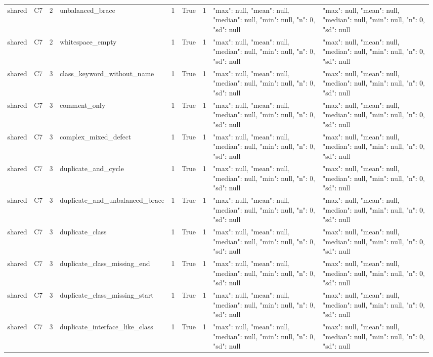 \begin{tabular}{lllllllll}
shared & C7 & 2 & unbalanced\_brace & 1 & True & 1 & {"max": null, "mean": null, "median": null, "min": null, "n": 0, "sd": null} & {"max": null, "mean": null, "median": null, "min": null, "n": 0, "sd": null} \\
shared & C7 & 2 & whitespace\_empty & 1 & True & 1 & {"max": null, "mean": null, "median": null, "min": null, "n": 0, "sd": null} & {"max": null, "mean": null, "median": null, "min": null, "n": 0, "sd": null} \\
shared & C7 & 3 & class\_keyword\_without\_name & 1 & True & 1 & {"max": null, "mean": null, "median": null, "min": null, "n": 0, "sd": null} & {"max": null, "mean": null, "median": null, "min": null, "n": 0, "sd": null} \\
shared & C7 & 3 & comment\_only & 1 & True & 1 & {"max": null, "mean": null, "median": null, "min": null, "n": 0, "sd": null} & {"max": null, "mean": null, "median": null, "min": null, "n": 0, "sd": null} \\
shared & C7 & 3 & complex\_mixed\_defect & 1 & True & 1 & {"max": null, "mean": null, "median": null, "min": null, "n": 0, "sd": null} & {"max": null, "mean": null, "median": null, "min": null, "n": 0, "sd": null} \\
shared & C7 & 3 & duplicate\_and\_cycle & 1 & True & 1 & {"max": null, "mean": null, "median": null, "min": null, "n": 0, "sd": null} & {"max": null, "mean": null, "median": null, "min": null, "n": 0, "sd": null} \\
shared & C7 & 3 & duplicate\_and\_unbalanced\_brace & 1 & True & 1 & {"max": null, "mean": null, "median": null, "min": null, "n": 0, "sd": null} & {"max": null, "mean": null, "median": null, "min": null, "n": 0, "sd": null} \\
shared & C7 & 3 & duplicate\_class & 1 & True & 1 & {"max": null, "mean": null, "median": null, "min": null, "n": 0, "sd": null} & {"max": null, "mean": null, "median": null, "min": null, "n": 0, "sd": null} \\
shared & C7 & 3 & duplicate\_class\_missing\_end & 1 & True & 1 & {"max": null, "mean": null, "median": null, "min": null, "n": 0, "sd": null} & {"max": null, "mean": null, "median": null, "min": null, "n": 0, "sd": null} \\
shared & C7 & 3 & duplicate\_class\_missing\_start & 1 & True & 1 & {"max": null, "mean": null, "median": null, "min": null, "n": 0, "sd": null} & {"max": null, "mean": null, "median": null, "min": null, "n": 0, "sd": null} \\
shared & C7 & 3 & duplicate\_interface\_like\_class & 1 & True & 1 & {"max": null, "mean": null, "median": null, "min": null, "n": 0, "sd": null} & {"max": null, "mean": null, "median": null, "min": null, "n": 0, "sd": null} \\

\end{tabular}
